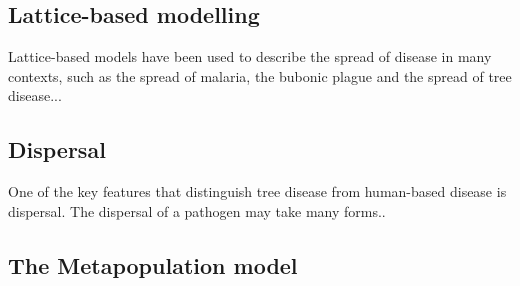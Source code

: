 \subsection{Lattice-based modelling}
Lattice-based models have been used to describe the spread of disease in many contexts, such as the spread of malaria, the bubonic plague and the spread of tree disease...



\subsection{Dispersal}
\label{ch2:dispersal}
One of the key features that distinguish tree disease from human-based disease is dispersal. The dispersal of a pathogen may take many forms..

\subsection{The Metapopulation model}



